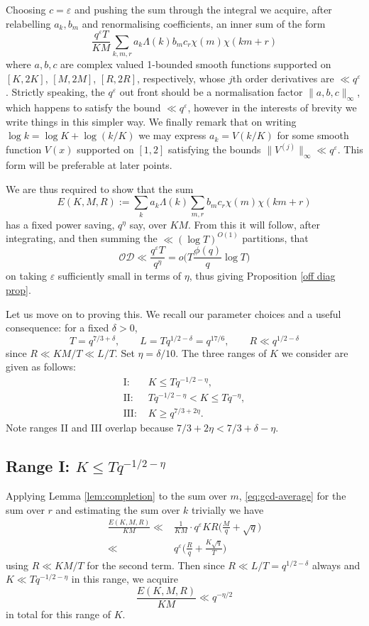 \documentclass[12pt, oneside]{amsart}
\theoremstyle{definition}
\newcommand{\mc}{\mathcal}
\newcommand{\leqs}{\leqslant }
\newcommand{\geqs}{\geqslant }
\newcommand{\eps}{\varepsilon}
\newcommand{\1}{\mathds{1}}
\begin{document}
Choosing $c=\eps$ and pushing the sum through the integral we acquire, after relabelling $a_k,b_m$ and renormalising coefficients, an inner sum of the form
\[
\frac{q^\eps T}{KM}\sum_{k,m, r}a_k \Lambda(k)b_mc_r\chi(m)\chi(km+r)
\]
where $a,b,c$ are complex valued 1-bounded smooth functions supported on $[K,2K]$, $[M,2M]$, $[R,2R]$, respectively, whose $j$th order derivatives are $\ll q^\eps$. Strictly speaking, the $q^\eps$ out front should be a normalisation factor $\|a,b,c\|_\infty$, which happens to satisfy the bound $\ll q^\eps$, however in the interests of brevity we write things in this simpler way. We finally remark that on writing $\log k=\log K+\log(k/K)$ we may express $a_k=V(k/K)$ for some smooth function $V(x)$ supported on $[1,2]$ satisfying the bounds $\|V^{(j)}\|_\infty\ll q^\eps$. This form will be preferable at later points.   


We are thus required to show that the sum 
\[
E(K,M,R):=\sum_{k}a_k\Lambda(k)\sum_{m, r}b_mc_r\chi(m)\chi(km+r)
\]
has a fixed power saving, $q^{\eta}$ say, over $KM$. From this it will follow, after integrating, and then summing the $\ll (\log T)^{O(1)}$ partitions,  that
\[
\mc{OD}\ll \frac{q^{\eps}T}{q^\eta}=o\Big(T\frac{\phi(q)}{q}\log T\Big)
\]
on taking $\varepsilon$ sufficiently small in terms of $\eta$, thus giving Proposition \ref{off diag prop}.

Let us move on to proving this. 
We recall our parameter choices and a useful consequence: for a fixed $\delta>0$,
 \[
 T=q^{7/3+\delta},\qquad
 L=Tq^{1/2-\delta}=q^{17/6}, \qquad
 R\ll q^{1/2-\delta}
\]
since $R\ll KM/T\ll L/T$. 
Set $\eta=\delta/10$. The three ranges of $K$ we consider are given as follows: 
\begin{align}
 \text{I: }&K\leqs Tq^{-1/2-\eta},
 \label{eq:range-I}\\
 \text{II: }&Tq^{-1/2-\eta}<K\leqs Tq^{-\eta},
 \label{eq:range-II}\\
 \text{III: }&K\geqs q^{7/3+2\eta}.
 \label{eq:range-III}
\end{align}
Note ranges II and III overlap because
$7/3+2\eta<7/3+\delta-\eta$.

\subsection{Range I: $K\leqs Tq^{-1/2-\eta}$} Applying Lemma \ref{lem:completion} to the sum over $m$, \eqref{eq:gcd-average} for the sum over $r$ and estimating the sum over $k$ trivially we have 
\begin{align*}
\frac{E(K,M,R)}{KM}
\ll &
 \frac{1}{KM}\cdot q^\eps KR\bigg(\frac{M}{q}+\sqrt{q}\bigg) 
 \\
 \ll & q^\eps\bigg(\frac{R}{q}+\frac{K\sqrt{q}}{T}\bigg)
\end{align*}
using $R\ll KM/T$ for the second term. Then since $R\ll L/T= q^{1/2-\delta}$ always and $K\ll Tq^{-1/2-\eta}$ in this range, we acquire 
\begin{equation}\label{I}
\frac{E(K,M,R)}{KM}
\ll
 q^{-\eta/2}
 \end{equation} 
 in total for this range of $K$.  
\end{document}
